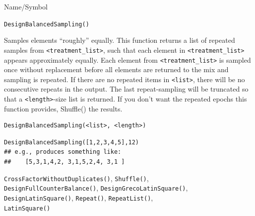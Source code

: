 \begin{desc}{Name/Symbol}
\item[Name/Symbol]  	\verb+DesignBalancedSampling()+

\item[Description] 	Samples elements ``roughly'' equally.
  		This function returns a list of repeated samples from
 		\verb+<treatment_list>+, such that each element in \verb+<treatment_list>+ 
		appears approximately equally.  Each element from 
		\verb+<treatment_list>+ is sampled once without replacement before 
		all elements are returned to the mix and sampling is repeated.  
		If there are no repeated items in \verb+<list>+, there will be no
 		consecutive repeats in the output.  The last repeat-sampling 
		will be truncated so that a \verb+<length>+-size list is returned.  
		If you don't want the repeated epochs this function provides, 
		Shuffle() the results.

\item[Usage]
\begin{verbatim}
DesignBalancedSampling(<list>, <length>)
\end{verbatim}

\item[Example]
\begin{verbatim}
DesignBalancedSampling([1,2,3,4,5],12)
## e.g., produces something like:
##    [5,3,1,4,2, 3,1,5,2,4, 3,1 ]
\end{verbatim}

\item[See Also]	\verb+CrossFactorWithoutDuplicates()+,
  \verb+Shuffle()+,\\ \verb+DesignFullCounterBalance()+,
  		\verb+DesignGrecoLatinSquare()+, \\
\verb+DesignLatinSquare()+, \verb+Repeat()+, 
		\verb+RepeatList()+,  \\\verb+LatinSquare()+

\end{desc}






